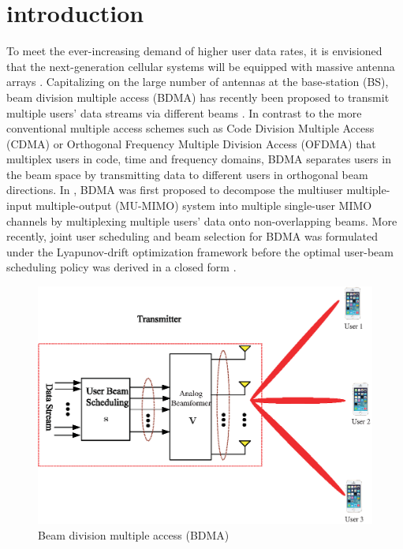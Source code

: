 \documentclass[conference]{IEEEtran}
\begin{document}
\section{introduction}
To meet the ever-increasing demand of higher user data rates, it is envisioned that the next-generation cellular systems will be equipped with massive antenna arrays \cite{boccardi2014five}. Capitalizing on the large number of antennas at the base-station (BS), beam division multiple access (BDMA) has recently been proposed to transmit multiple users' data streams via different beams \cite{sun2015beam, Jiang2018}. In contrast to the more conventional multiple access schemes such as Code Division Multiple Access (CDMA) or Orthogonal Frequency Multiple Division Access (OFDMA) that multiplex users in code, time and frequency domains, BDMA separates users in the beam space by transmitting data to different users in orthogonal beam directions. In \cite{sun2015beam}, BDMA was first proposed to decompose the multiuser multiple-input multiple-output (MU-MIMO) system into multiple single-user MIMO channels by multiplexing multiple users' data onto non-overlapping beams. More recently, joint user scheduling and beam selection for BDMA was formulated under the Lyapunov-drift optimization framework before the optimal user-beam scheduling policy was derived in a closed form \cite{Jiang2018}.

\begin{figure}[h]
    \begin{center}
	\includegraphics[scale=0.55]{Figure/BDMA.eps}
	\caption{Beam division multiple access (BDMA)}\label{fig:BDMA}
    \end{center}
\end{figure}
\end{document}
